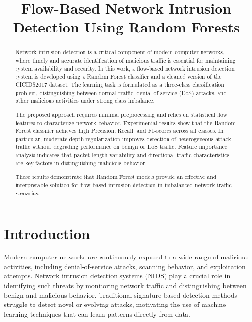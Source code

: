 \documentclass[conference]{IEEEtran}
\begin{document}
\title{Flow-Based Network Intrusion Detection Using Random Forests}

\author{
}

\maketitle

\begin{abstract}
Network intrusion detection is a critical component of modern computer networks, where timely and accurate identification of malicious traffic is essential for maintaining system availability and security. In this work, a flow-based network intrusion detection system is developed using a Random Forest classifier and a cleaned version of the CICIDS2017 dataset. The learning task is formulated as a three-class classification problem, distinguishing between normal traffic, denial-of-service (DoS) attacks, and other malicious activities under strong class imbalance.

The proposed approach requires minimal preprocessing and relies on statistical flow features to characterize network behavior. Experimental results show that the Random Forest classifier achieves high Precision, Recall, and F1-scores across all classes. In particular, moderate depth regularization improves detection of heterogeneous attack traffic without degrading performance on benign or DoS traffic. Feature importance analysis indicates that packet length variability and directional traffic characteristics are key factors in distinguishing malicious behavior.

These results demonstrate that Random Forest models provide an effective and interpretable solution for flow-based intrusion detection in imbalanced network traffic scenarios.
\end{abstract}

\section{Introduction}

Modern computer networks are continuously exposed to a wide range of malicious activities, including denial-of-service attacks, scanning behavior, and exploitation attempts. Network intrusion detection systems (NIDS) play a crucial role in identifying such threats by monitoring network traffic and distinguishing between benign and malicious behavior. Traditional signature-based detection methods struggle to detect novel or evolving attacks, motivating the use of machine learning techniques that can learn patterns directly from data.
\end{document}
